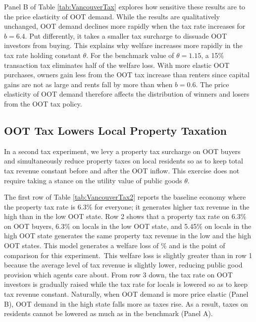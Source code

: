 \documentclass[letterpaper,12pt,dvipsnames,usenames]{article}
\theoremstyle{definition}
\begin{document}
\begin{spacing}{1.25}
{Panel B of Table \ref{tab:VancouverTax} explores how sensitive these results are to the price elasticity of OOT demand. While the results are qualitatively unchanged, OOT demand declines more rapidly when the tax rate increases for $b=6.4$. Put differently, it takes a smaller tax surcharge to dissuade OOT investors from buying. This explains why welfare increases more rapidly in the tax rate holding constant $\theta$. For the benchmark value of $\theta = 1.15$, a 15\% transaction tax eliminates half of the welfare loss.  With more elastic OOT purchases, owners gain less from the OOT tax increase than renters since capital gains are not as large and rents fall by more than when $b=0.6$. The price elasticity of OOT demand therefore affects the distribution of winners and losers from the OOT tax policy.


\subsection{OOT Tax Lowers Local Property Taxation}

In a second tax experiment, we levy a property tax surcharge on OOT buyers and simultaneously reduce property taxes on local residents so as to keep total tax revenue constant before and after the OOT inflow. This exercise does not require taking a stance on the utility value of public goods $\theta$.

The first row of Table \ref{tab:VancouverTax2} reports the baseline economy where the property tax rate is 6.3\% for everyone; it generates higher tax revenue in the high than in the low OOT state.
Row 2 shows that a property tax rate on 6.3\% on OOT buyers, 6.3\% on locals in the low OOT state, and 5.45\% on locals in the high OOT state generates the same property tax revenue in the low and the high OOT states. This model generates a welfare loss of {}\% and is the point of comparison for this experiment.\  This welfare loss is slightly greater than in row 1 because the average level of tax revenue is slightly lower, reducing public good provision which agents care about. From row 3 down, the tax rate on OOT investors is gradually raised while the tax rate for locals is lowered so as to keep tax revenue constant. Naturally, when OOT demand is more price elastic (Panel B), OOT demand in the high state falls more as taxes rise. As a result, taxes on residents cannot be lowered as much as in the benchmark (Panel A).

}
\end{spacing}
\end{document}

